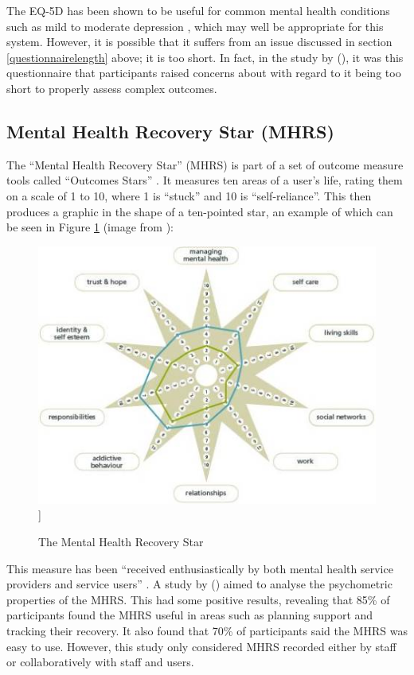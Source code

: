 \documentclass[11pt,openright,a4paper]{report}
\begin{document}
The EQ-5D has been shown to be useful for common mental health conditions such as mild to moderate depression \parencite{brazier2010eq}, which may well be appropriate for this system. However, it is possible that it suffers from an issue discussed in section \ref{questionnairelength} above; it is too short. In fact, in the study by \citeauthor{crawford2011selecting} (\citeyear{crawford2011selecting}), it was this questionnaire that participants raised concerns about with regard to it being too short to properly assess complex outcomes.

\newpage
\subsection{Mental Health Recovery Star (MHRS)}
The \enquote{Mental Health Recovery Star} (MHRS) is part of a set of outcome measure tools called \enquote{Outcomes Stars} \parencite{outcomesstars}. It measures ten areas of a user's life, rating them on a scale of 1 to 10, where 1 is \enquote{stuck} and 10 is \enquote{self-reliance}. This then produces a graphic in the shape of a ten-pointed star, an example of which can be seen in Figure \ref{fig:mhrs} (image from \parencite{outcomesstars}):

\begin{figure}[ht]
\centering
\caption{The Mental Health Recovery Star}
\includegraphics[width=\textwidth]{i/recoverystar.jpg}]
\label{fig:mhrs}
\end{figure}

This measure has been \enquote{received enthusiastically by both
mental health service providers and service users} \parencite{dickens2012recovery}. A study by \citeauthor{killaspy2012psychometric} (\citeyear{killaspy2012psychometric}) aimed to analyse the psychometric properties of the MHRS. This had some positive results, revealing that 85\% of participants found the MHRS useful in areas such as planning support and tracking their recovery. It also found that 70\% of participants said the MHRS was easy to use. However, this study only considered MHRS recorded either by staff or collaboratively with staff and users.
\end{document}
